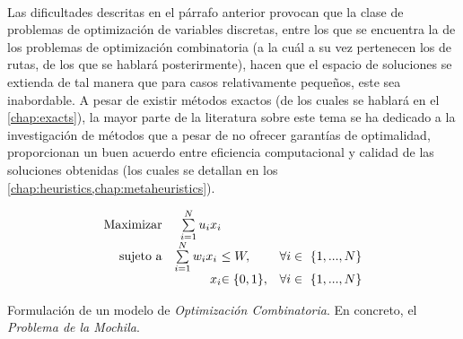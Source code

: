 \documentclass{subfiles}
\begin{document}
        \paragraph{}
        Las dificultades descritas en el párrafo anterior provocan que la clase de problemas de optimización de variables discretas, entre los que se encuentra la de los problemas de optimización combinatoria (a la cuál a su vez pertenecen los de rutas, de los que se hablará posterirmente), hacen que el espacio de soluciones se extienda de tal manera que para casos relativamente pequeños, este sea inabordable. A pesar de existir métodos exactos (de los cuales se hablará en el \cref{chap:exacts}), la mayor parte de la literatura sobre este tema se ha dedicado a la investigación de métodos que a pesar de no ofrecer garantías de optimalidad, proporcionan un buen acuerdo entre eficiencia computacional y calidad de las soluciones obtenidas (los cuales se detallan en los \cref{chap:heuristics,chap:metaheuristics}).

        \begin{eqfloat}
          \begin{equation}
            \begin{array}{rr@{}ll}
              \text{Maximizar} & \sum\limits_{i = 1}^{N} u_{i}x_{i} &                 & \\
              \text{sujeto a}	 & \sum\limits_{i = 1}^{N} w_{i}x_{i} \ &\leq W, & \forall i \in \{1,...,N\} \\
                               &                             	x_{i} 	&\in \{0, 1\}, 	                 & \forall i \in \{1,...,N\}
            \end{array}
          \end{equation}
          \caption{Formulación de un modelo de \emph{Optimización Combinatoria}. En concreto, el \emph{Problema de la Mochila}.}
          \label{eq:combinatorial_optimization_formulation}
        \end{eqfloat}
\end{document}
